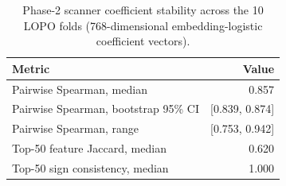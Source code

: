 \begin{table}[h]\centering\footnotesize
\caption{Phase-2 scanner coefficient stability across the 10 LOPO folds (768-dimensional embedding-logistic coefficient vectors).}\label{tab:scannerstab}
\begin{tabular}{lr}
\toprule Metric & Value \\
\midrule
Pairwise Spearman, median & 0.857 \\
Pairwise Spearman, bootstrap 95\% CI & [0.839, 0.874] \\
Pairwise Spearman, range & [0.753, 0.942] \\
Top-50 feature Jaccard, median & 0.620 \\
Top-50 sign consistency, median & 1.000 \\
\bottomrule
\end{tabular}
\end{table}
